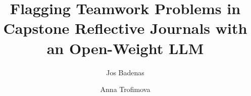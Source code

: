 \documentclass[sigconf,review,anonymous]{acmart}
\begin{document}
\title{Flagging Teamwork Problems in Capstone Reflective Journals with an Open-Weight LLM}

\author{Jos Badenas}

\author{Anna Trofimova}

\begin{abstract}
\end{abstract}


\maketitle











\end{document}
